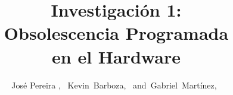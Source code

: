 \documentclass[10pt,journal,compsoc]{IEEEtran}
\begin{document}
%
\title{Investigación 1:\\ Obsolescencia Programada\\ en el Hardware}
%
%
%
%

\author{José Pereira ,~
        Kevin~Barboza,~
        and~Gabriel~Martínez,~%
}

% 
%
\end{document}
